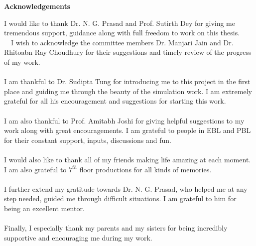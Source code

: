\begin{center}
\Large  {\bf Acknowledgements }
\end{center}
I would like to thank Dr. N. G. Prasad and Prof. Sutirth Dey for giving me tremendous support, guidance along with full freedom to work on this thesis. \\\ \
I wish to acknowledge the committee members Dr. Manjari Jain and Dr. Rhitoabn Ray Choudhury for their suggestions and timely review of the progress of my work.\\\\
I am thankful to Dr. Sudipta Tung for introducing me to this project in the first place and guiding me through the beauty of the simulation work. I am extremely grateful for all his encouragement and suggestions for starting this work.\\\\
I am also thankful to Prof. Amitabh Joshi for giving helpful suggestions to my work along with great encouragements. I am grateful to people in EBL and PBL for their constant support, inputs, discussions and fun.\\\\
I would also like to thank all of my friends making life amazing at each moment. I am also grateful to $7^{th}$ floor productions for all kinds of memories.\\\\
I further extend my gratitude towards Dr. N. G. Prasad, who helped me at any step needed, guided me through difficult situations. I am grateful to him for being an excellent mentor.\\\\
Finally, I especially thank my parents and my sisters for being incredibly supportive and encouraging me during my work.
\vfill
\cleardoublepage
